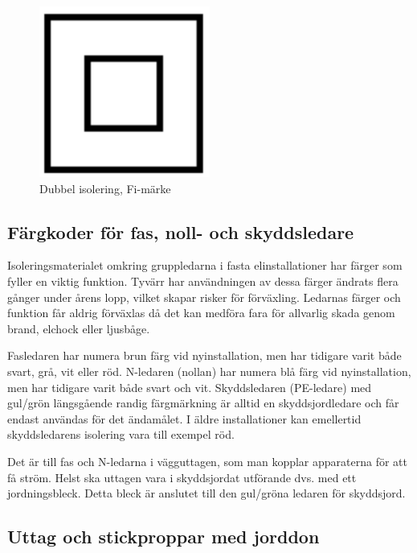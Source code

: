 \begin{figure}
	\includegraphics[width=0.5\textwidth]{images/cropped_pdfs/Fi-mark.pdf}
	\caption{Dubbel isolering, Fi-märke}
	\label{fig:Fi-mark}
\end{figure}

\subsection{Färgkoder för fas, noll- och skyddsledare}

Isoleringsmaterialet omkring gruppledarna i fasta elinstallationer har
färger som fyller en viktig funktion.
Tyvärr har användningen av dessa färger ändrats flera gånger under årens lopp,
vilket skapar risker för förväxling.
Ledarnas färger och funktion får aldrig förväxlas då det kan medföra fara för
allvarlig skada genom brand, elchock eller ljusbåge.

Fasledaren har numera brun färg vid nyinstallation, men har tidigare varit
både svart, grå, vit eller röd.
N-ledaren (nollan) har numera blå färg vid nyinstallation, men har tidigare
varit både svart och vit.
Skyddsledaren (PE-ledare) med gul/grön längsgående randig färgmärkning är
alltid en skyddsjordledare och får endast användas för det ändamålet.
I äldre installationer kan emellertid skyddsledarens isolering vara till exempel röd.

Det är till fas och N-ledarna i vägguttagen, som man kopplar apparaterna för
att få ström.
Helst ska uttagen vara i skyddsjordat utförande dvs. med ett jordningsbleck.
Detta bleck är anslutet till den gul/gröna ledaren för skyddsjord.

\subsection{Uttag och stickproppar med jorddon}

